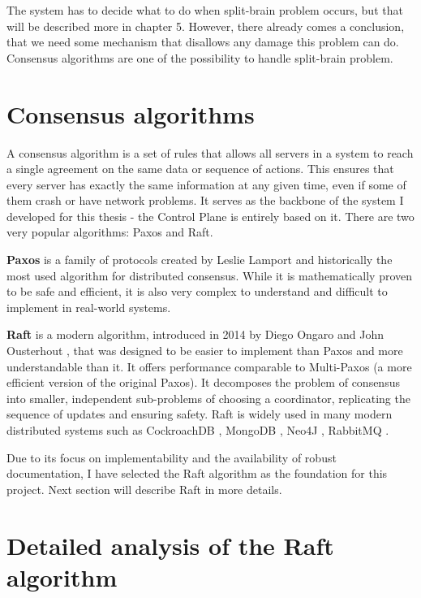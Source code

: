 \documentclass[shortabstract]{iithesis}
\begin{document}
The system has to decide what to do when split-brain problem occurs, but that will be described more in chapter 5. However, there already comes a conclusion, that we need some mechanism that disallows any damage this problem can do. Consensus algorithms are one of the possibility to handle split-brain problem.

\section{Consensus algorithms} \label{sec:consensus_algorithms}

A consensus algorithm is a set of rules that allows all servers in a system to reach a single agreement on the same data or sequence of actions. This ensures that every server has exactly the same information at any given time, even if some of them crash or have network problems. It serves as the backbone of the system I developed for this thesis - the Control Plane is entirely based on it. There are two very popular algorithms: Paxos and Raft.

\textbf{Paxos} is a family of protocols created by Leslie Lamport \cite{paxos} and historically the most used algorithm for distributed consensus. While it is mathematically proven to be safe and efficient, it is also very complex to understand and difficult to implement in real-world systems. 

\textbf{Raft} is a modern algorithm, introduced in 2014 by Diego Ongaro and John Ousterhout \cite{raft}, that was designed to be easier to implement than Paxos and more understandable than it. It offers performance comparable to Multi-Paxos \cite{paxos_simple} (a more efficient version of the original Paxos). It decomposes the problem of consensus into smaller, independent sub-problems of choosing a coordinator, replicating the sequence of updates and ensuring safety. Raft is widely used in many modern distributed systems such as CockroachDB \cite{cockroach}, MongoDB \cite{mongodb}, Neo4J \cite{neo4j}, RabbitMQ \cite{rabbitmq}. 

Due to its focus on implementability and the availability of robust documentation, I have selected the Raft algorithm as the foundation for this project. Next section will describe Raft in more details.

\section{Detailed analysis of the Raft algorithm}
\end{document}
